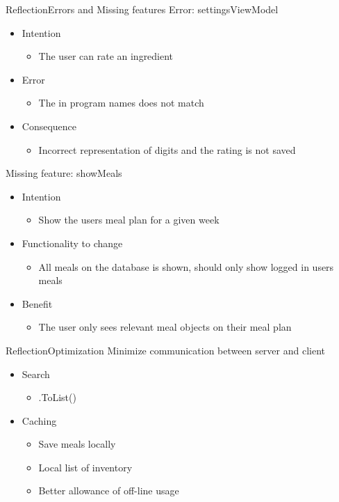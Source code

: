 \begin{frame}{Reflection}{Errors and Missing features}%
	Error: settingsViewModel
	\begin{itemize}
		\item Intention
			\begin{itemize}
			\item The user can rate an ingredient
			\end{itemize}
		\item Error
			\begin{itemize}
			\item The in program names does not match
			\end{itemize}
		\item Consequence
			\begin{itemize}
			\item Incorrect representation of digits and the rating is not saved
			\end{itemize}
	\end{itemize}
	
		Missing feature: showMeals
		\begin{itemize}
			\item Intention
				\begin{itemize}
				\item Show the users meal plan for a given week
				\end{itemize}
			\item Functionality to change
				\begin{itemize}
				\item All meals on the database is shown, should only show logged in users meals
				\end{itemize}
			\item Benefit
				\begin{itemize}
				\item The user only sees relevant meal objects on their meal plan
				\end{itemize}
		\end{itemize}
\end{frame} %


\begin{frame}{Reflection}{Optimization}
	Minimize communication between server and client
	\begin{itemize}
		\item Search
		\begin{itemize}
			\item .ToList()
		\end{itemize}
		\item Caching
		\begin{itemize}
			\item Save meals locally
			\item Local list of inventory
			\item Better allowance of off-line usage
		\end{itemize}
	\end{itemize}
\end{frame}

